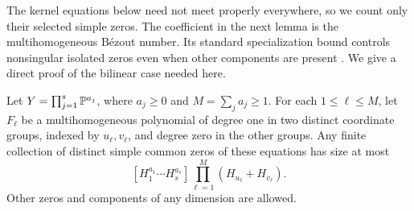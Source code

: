 The kernel equations below need not meet properly everywhere, so we count
only their selected simple zeros. The coefficient in the next lemma is
the multihomogeneous B\'ezout number. Its standard specialization bound
controls nonsingular isolated zeros even when other components are present
\cite[Sections~3--3.2]{Wampler1996}. We give a direct proof of the bilinear
case needed here.

\begin{lemma}\label{polar:product-count}
Let $Y=\prod_{j=1}^s\mathbb P^{a_j}$, where $a_j\ge0$ and
$M=\sum_j a_j\ge1$. For each $1\le\ell\le M$, let $F_\ell$ be a
multihomogeneous polynomial of degree one in two distinct coordinate
groups, indexed by $u_\ell,v_\ell$, and degree zero in the other groups.
Any finite collection of distinct simple common zeros of these equations
has size at most
\begin{equation}\label{polar:product-coefficient}
 [H_1^{a_1}\cdots H_s^{a_s}]
       \prod_{\ell=1}^M(H_{u_\ell}+H_{v_\ell}).
\end{equation}
Other zeros and components of any dimension are allowed.
\end{lemma}

